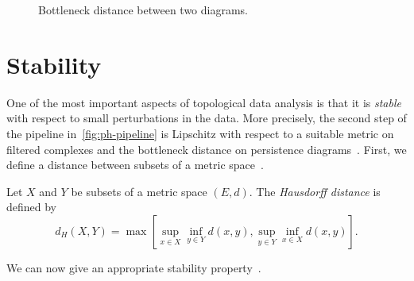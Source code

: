 \documentclass[a4paper,11pt,openany,extrafontsizes]{memoir}
\begin{document}
\begin{figure}[ht]
  \centering
  \caption{Bottleneck distance between two diagrams.}%
  \label{fig:bottleneck}
\end{figure}

\section{Stability}%
\label{sec:stability}

One of the most important aspects of topological data analysis is that
it is \emph{stable} with respect to small perturbations in the
data. More precisely, the second step of the pipeline
in~\autoref{fig:ph-pipeline} is Lipschitz with respect to a suitable
metric on filtered complexes and the bottleneck distance on
persistence
diagrams~\cite{cohen-steiner_stability_2007,chazal_persistence_2014}. First,
we define a distance between subsets of a metric
space~\cite{oudot_persistence_2015}.

\begin{defn}
  Let $X$ and $Y$ be subsets of a metric space $(E, d)$. The
  \emph{Hausdorff distance} is defined by
  \[ d_H(X,Y) = \max \left[ \sup_{x\in X} \inf_{y\in Y} d(x,y),
      \sup_{y\in Y} \inf_{x\in X} d(x,y) \right]. \]
\end{defn}

We can now give an appropriate stability
property~\cite{cohen-steiner_stability_2007,chazal_persistence_2014}.
\end{document}
